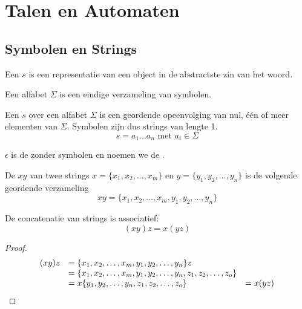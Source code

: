\documentclass[main.tex]{subfiles}
\begin{document}
\chapter{Talen en Automaten}
\label{cha:talen-en-automaten}

\section{Symbolen en Strings}
\label{sec:symbolen-en-strings}

\begin{de}
  Een  $s$ is een representatie van een object in de abstractste zin van het woord. 
\end{de}

\begin{de}
  Een alfabet $\Sigma$ is een eindige verzameling van symbolen.
\end{de}

\begin{de}
  Een  $s$ over een alfabet $\Sigma$ is een geordende opeenvolging van nul, \'e\'en of meer elementen van $\Sigma$. Symbolen zijn dus strings van lengte 1.
  \[ s = a_{1}\ldots a_{n} \text{ met } a_{i} \in \Sigma \]
\end{de}

\begin{de}
  $\epsilon$ is de  zonder symbolen en noemen we de .
\end{de}


\begin{de}
  De  $xy$ van twee strings $x = \{x_1,x_2,\ldots,x_m\}$ en $y =   \{y_1,y_2,\ldots,y_n\}$ is de volgende geordende verzameling  
  \[
  xy = \{ x_1,x_2,\ldots,x_m,y_1,y_2,\ldots,y_n\}
  \] 
\end{de}

\begin{ei}
  De concatenatie van strings is associatief:
  \[
  (xy)z = x(yz)
  \]

  \begin{proof}
    \[
    \begin{array}{r l l}
      (xy)z &= \{x_1,x_2,\ldots,x_m,y_1,y_2,\ldots,y_n\}z &\\
            &= \{x_1,x_2,\ldots,x_m,y_1,y_2,\ldots,y_n,z_1,z_2,\ldots,z_o\} &\\
            &= x\{y_1,y_2,\ldots,y_n,z_1,z_2,\ldots,z_o\} &= x(yz)
    \end{array}
    \]
  \end{proof}
\end{ei}
\end{document}
